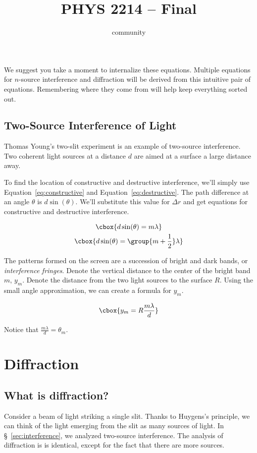\documentclass{hw} \title{PHYS 2214 -- Final} \author{community}
\numberwithin{equation}{section}
\begin{document}
We suggest you take a moment to internalize these equations. Multiple equations
for $n$-source interference and diffraction will be derived from this intuitive
pair of equations. Remembering where they come from will help keep everything
sorted out.

\subsection{Two-Source Interference of Light} Thomas Young's two-slit
experiment is an example of two-source interference.  Two coherent light
sources at a distance $d$ are aimed at a surface a large distance away. 

To find the location of constructive and destructive interference, we'll simply
use Equation~\ref{eq:constructive} and Equation~\ref{eq:destructive}. The path
difference at an angle $\theta$ is $d \sin(\theta)$. We'll substitute this
value for $\Delta r$ and get equations for constructive and destructive
interference.

\begin{gather} \cbox{d \sin(\theta) = m \lambda}
  \label{eq:interference-constructive} \\ \cbox{d \sin(\theta) = \group{m +
  \frac{1}{2}} \lambda} \end{gather}

The patterns formed on the screen are a succession of bright and dark bands, or
\emph{interference fringes}. Denote the vertical distance to the center of the
bright band $m$, $y_m$. Denote the distance from the two light sources to the
surface $R$. Using the small angle approximation, we can create a formula for
$y_m$.

\begin{equation} \cbox{y_m = R \frac{m \lambda}{d}} \end{equation}

Notice that $\frac{m \lambda}{d} = \theta_m$.

\section{Diffraction} \subsection{What is diffraction?} Consider a beam of
light striking a single slit. Thanks to Huygens's principle, we can think of
the light emerging from the slit as many sources of light. In
\S~\ref{sec:interference}, we analyzed two-source interference. The analysis of
diffraction is is identical, except for the fact that there are more sources.
\end{document}

